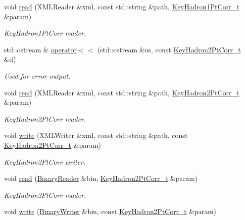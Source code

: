 \begin{DoxyCompactItemize}
void \mbox{\hyperlink{namespaceFF_acb4db5dbe27937736b4f2cbed9694c56}{read}} (X\+M\+L\+Reader \&xml, const std\+::string \&path, \mbox{\hyperlink{structFF_1_1KeyHadron1PtCorr__t}{Key\+Hadron1\+Pt\+Corr\+\_\+t}} \&param)
\begin{DoxyCompactList}\small\item\em Key\+Hadron1\+Pt\+Corr reader. \end{DoxyCompactList}\item 
std\+::ostream \& \mbox{\hyperlink{namespaceFF_afe0b42b2e221ac6c88359573f349a4e7}{operator$<$$<$}} (std\+::ostream \&os, const \mbox{\hyperlink{structFF_1_1KeyHadron2PtCorr__t}{Key\+Hadron2\+Pt\+Corr\+\_\+t}} \&d)
\begin{DoxyCompactList}\small\item\em Used for error output. \end{DoxyCompactList}\item 
void \mbox{\hyperlink{namespaceFF_ac879699f10e046e5a2059a2efcf1408b}{read}} (X\+M\+L\+Reader \&xml, const std\+::string \&path, \mbox{\hyperlink{structFF_1_1KeyHadron2PtCorr__t}{Key\+Hadron2\+Pt\+Corr\+\_\+t}} \&param)
\begin{DoxyCompactList}\small\item\em Key\+Hadron2\+Pt\+Corr reader. \end{DoxyCompactList}\item 
void \mbox{\hyperlink{namespaceFF_ae24f1269c1aa6329a00ea570a38546e6}{write}} (X\+M\+L\+Writer \&xml, const std\+::string \&path, const \mbox{\hyperlink{structFF_1_1KeyHadron2PtCorr__t}{Key\+Hadron2\+Pt\+Corr\+\_\+t}} \&param)
\begin{DoxyCompactList}\small\item\em Key\+Hadron2\+Pt\+Corr writer. \end{DoxyCompactList}\item 
void \mbox{\hyperlink{namespaceFF_a7b6f77b4f2cff40fc56befd4b4c64b7d}{read}} (\mbox{\hyperlink{classADATIO_1_1BinaryReader}{Binary\+Reader}} \&bin, \mbox{\hyperlink{structFF_1_1KeyHadron2PtCorr__t}{Key\+Hadron2\+Pt\+Corr\+\_\+t}} \&param)
\begin{DoxyCompactList}\small\item\em Key\+Hadron2\+Pt\+Corr reader. \end{DoxyCompactList}\item 
void \mbox{\hyperlink{namespaceFF_a1b83f6ebd714e1d672d8c425605ff1de}{write}} (\mbox{\hyperlink{classADATIO_1_1BinaryWriter}{Binary\+Writer}} \&bin, const \mbox{\hyperlink{structFF_1_1KeyHadron2PtCorr__t}{Key\+Hadron2\+Pt\+Corr\+\_\+t}} \&param)

\end{DoxyCompactItemize}

